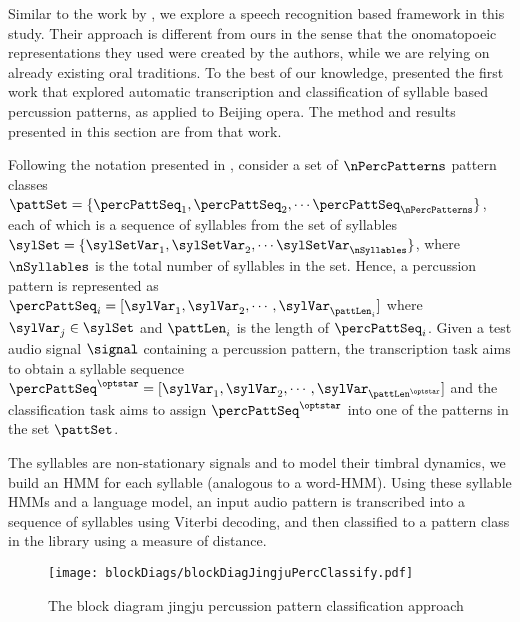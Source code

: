 Similar to the work by , we explore a speech recognition based framework in this study. Their approach is different from ours in the sense that the onomatopoeic representations they used were created by the authors, while we are relying on already existing oral traditions. To the best of our knowledge,  presented the first work that explored automatic transcription and classification of syllable based percussion patterns, as applied to Beijing opera. The method and results presented in this section are from that work. 

Following the notation presented in , consider a set of $\nPercPatterns$ pattern classes $\pattSet = \{\percPattSeq_1, \percPattSeq_2, \cdots \percPattSeq_\nPercPatterns\}$, each of which is a sequence of syllables from the set of syllables $\sylSet = \{\sylSetVar_1, \sylSetVar_2, \cdots \sylSetVar_\nSyllables\}$, where $\nSyllables$ is the total number of syllables in the set. Hence, a percussion pattern is represented as $\percPattSeq_i = [\sylVar_1, \sylVar_2, \cdots, \sylVar_{\pattLen_i}]$ where $\sylVar_j \in \sylSet$ and $\pattLen_i$ is the length of $\percPattSeq_i$. Given a test audio signal $\signal$ containing a percussion pattern, the transcription task aims to obtain a syllable sequence $\percPattSeq^{\optstar} = [\sylVar_1, \sylVar_2, \cdots, \sylVar_{\pattLen^{\optstar}}]$ and the classification task aims to assign $\percPattSeq^{\optstar}$ into one of the patterns in the set $\pattSet$. 

The syllables are non-stationary signals and to model their timbral dynamics, we build an \gls{HMM} for each syllable (analogous to a word-\gls{HMM}). Using these syllable \glspl{HMM} and a language model, an input audio pattern is transcribed into a sequence of syllables using Viterbi decoding, and then classified to a pattern class in the library using a measure of distance.
\begin{figure}[t]
\centering
 \texttt{[image: blockDiags/blockDiagJingjuPercClassify.pdf]}
\caption[Block diagram: \Gls{jingju} percussion pattern classification]{The block diagram \gls{jingju} percussion pattern classification approach}\label{fig:BD:jingjuPercClassify}
\end{figure}

